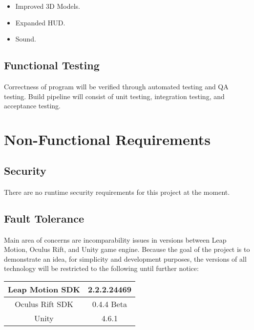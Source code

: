 \begin{itemize}
	\item Improved 3D Models.
	\item Expanded HUD.
	\item Sound.
\end{itemize}

\subsection{Functional Testing}

\paragraph{} Correctness of program will be verified through automated testing and QA testing. Build pipeline will consist of unit testing, integration testing, and acceptance testing.

\section{Non-Functional Requirements}

\subsection{Security}

\paragraph{} There are no runtime security requirements for this project at the moment.

\subsection{Fault Tolerance}

\paragraph{} Main area of concerns are incomparability issues in versions between Leap Motion, Oculus Rift, and Unity game engine. Because the goal of the project is to demonstrate an idea, for simplicity and development purposes, the versions of all technology will be restricted to the following until further notice:

\begin{table}[H]
	\renewcommand*{\arraystretch}{1.5}
	\centering
	\begin{tabular}{| c | c |}
		\hline
		Leap Motion SDK		&	2.2.2.24469\\
		\hline
		Oculus Rift SDK		&	0.4.4 Beta\\
		\hline
		Unity				&	4.6.1\\
		\hline
	\end{tabular}
\end{table}

